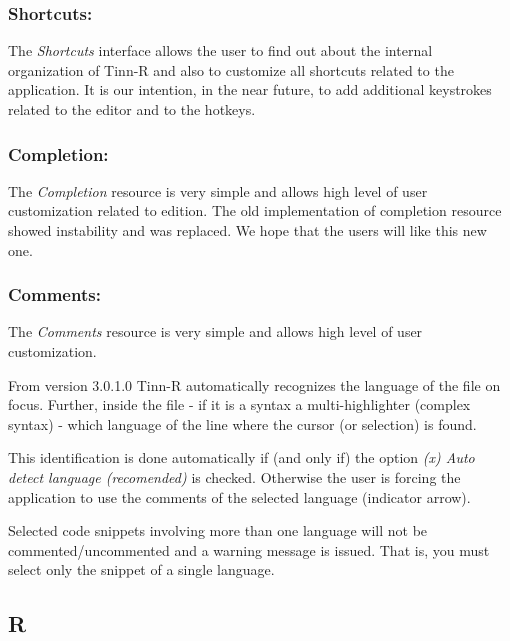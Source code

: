 \subsubsection{Shortcuts:}

The \textit{Shortcuts} interface allows the user to find out about
the internal organization of Tinn-R and also to customize all
shortcuts related to the application. It is our intention, in
the near future, to add additional keystrokes related to the
editor and to the \RR{} hotkeys.


\subsubsection{Completion:}

The \textit{Completion} resource is very simple and allows high level
of user customization related to edition. The old implementation of
completion resource showed instability and was replaced. We hope that
the users will like this new one.

\subsubsection{Comments:}

The \textit{Comments} resource is very simple and allows high level
of user customization.

From version 3.0.1.0 Tinn-R automatically recognizes the
language of the file on focus. Further, inside the file
- if it is a syntax a multi-highlighter (complex syntax) - which language of
the line where the cursor (or selection) is found.

This identification is done automatically if (and only if) the option
\textit{(x) Auto detect language (recomended)} is checked. Otherwise
the user is forcing the application to use the comments of the selected language
(indicator arrow).

Selected code snippets involving more than one language will not be commented/uncommented
and a warning message is issued. That is, you must select only the snippet of a single language.


\hypertarget{working_tools_r}{}
\subsection{R}


